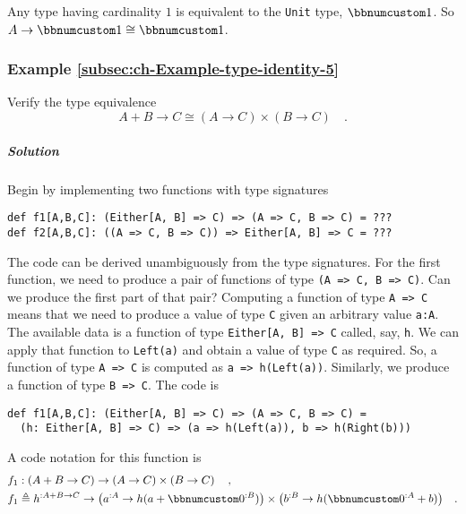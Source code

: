 Any type having cardinality $1$ is equivalent to the \lstinline!Unit!
type, $\bbnum 1$. So $A\rightarrow\bbnum 1\cong\bbnum 1$.

\subsubsection{Example \label{subsec:ch-Example-type-identity-5}\ref{subsec:ch-Example-type-identity-5}}

Verify the type equivalence 
\[
A+B\rightarrow C\cong(A\rightarrow C)\times(B\rightarrow C)\quad.
\]


\subparagraph{Solution}

Begin by implementing two functions with type signatures
\begin{lstlisting}
def f1[A,B,C]: (Either[A, B] => C) => (A => C, B => C) = ???
def f2[A,B,C]: ((A => C, B => C)) => Either[A, B] => C = ???
\end{lstlisting}
The code can be derived unambiguously from the type signatures. For
the first function, we need to produce a pair of functions of type
\lstinline!(A => C, B => C)!. Can we produce the first part of that
pair? Computing a function of type \lstinline!A => C! means that
we need to produce a value of type \lstinline!C! given an arbitrary
value \lstinline!a:A!. The available data is a function of type \lstinline!Either[A, B] => C!
called, say, \lstinline!h!. We can apply that function to \lstinline!Left(a)!
and obtain a value of type \lstinline!C! as required. So, a function
of type \lstinline!A => C! is computed as \lstinline!a => h(Left(a))!.
Similarly, we produce a function of type \lstinline!B => C!. The
code is
\begin{lstlisting}
def f1[A,B,C]: (Either[A, B] => C) => (A => C, B => C) =
  (h: Either[A, B] => C) => (a => h(Left(a)), b => h(Right(b)))
\end{lstlisting}
A code notation for this function is
\begin{align*}
 & f_{1}:\left(A+B\rightarrow C\right)\rightarrow\left(A\rightarrow C\right)\times\left(B\rightarrow C\right)\quad,\\
 & f_{1}\triangleq h^{:A+B\rightarrow C}\rightarrow\big(a^{:A}\rightarrow h(a+\bbnum 0^{:B})\big)\times\big(b^{:B}\rightarrow h(\bbnum 0^{:A}+b)\big)\quad.
\end{align*}


